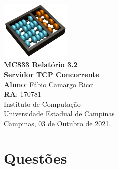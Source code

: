 \documentclass[12pt,a4paper]{report}
\begin{document}
\begin{titlepage}
    \begin{center}
        \vspace*{1cm}
        \includegraphics[width=0.25\textwidth]{Logo}\\
        \vspace{1.5cm}
        \Huge
    	\textbf{MC833 Relatório 3.2 \\
        Servidor TCP Concorrente} \\
        \vspace{1.5cm}
        \Large
        \textbf{Aluno}: Fábio Camargo Ricci\\
        \textbf{RA}: 170781\\
        \vspace{1.2cm}
    	\Large 
    	Instituto de Computação\\
    	Universidade Estadual de Campinas\\
    	\vspace{1.5cm}
        Campinas, 03 de Outubro de 2021.
    \end{center}
\end{titlepage}
\tableofcontents
\clearpage

\newcommand{\shellcmd}[1]{\texttt{\footnotesize\# #1}}%

\section{Questões}
\end{document}
